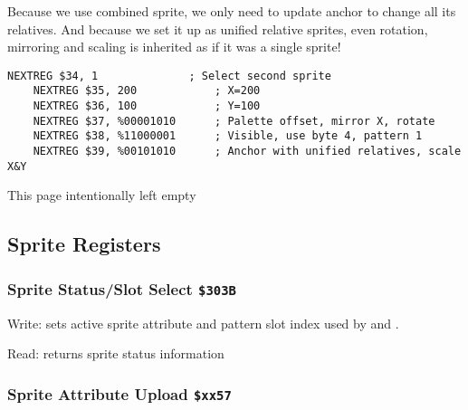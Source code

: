 \documentclass[12pt,twoside,openright,a4paper]{book}
\newcommand{\intentiallyempty}{
	\mbox{}
	\vfill
	\begin{center}
	This page intentionally left empty
	\end{center}
	\vfill
	\mbox{}
}
\begin{document}
Because we use combined sprite, we only need to update anchor to change all its relatives. And because we set it up as unified relative sprites, even rotation, mirroring and scaling is inherited as if it was a single sprite!

\begin{Verbatim}[gobble=1]
	NEXTREG $34, 1              ; Select second sprite
	NEXTREG $35, 200            ; X=200
	NEXTREG $36, 100            ; Y=100
	NEXTREG $37, %00001010      ; Palette offset, mirror X, rotate
	NEXTREG $38, %11000001      ; Visible, use byte 4, pattern 1
	NEXTREG $39, %00101010      ; Anchor with unified relatives, scale X&Y 
\end{Verbatim}


\pagebreak
\intentiallyempty
\pagebreak

\subsection{Sprite Registers}
\label{zx_next_sprite_registers}

\subsubsection{Sprite Status/Slot Select {\tt \$303B}}

Write: sets active sprite attribute and pattern slot index used by  and .

\begin{NextPort}
\end{NextPort}

Read: returns sprite status information

\begin{NextPort}
\end{NextPort}


\subsubsection{Sprite Attribute Upload {\tt \$xx57}}
\end{document}

